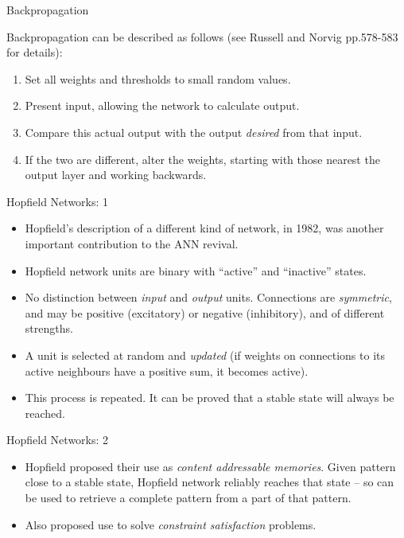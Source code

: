 \documentclass{article}
\begin{document}
\begin{slide}{}
{\Large Backpropagation}

Backpropagation can be described as follows (see Russell and Norvig
pp.578-583 for details):
\begin{enumerate}
\item Set all weights and thresholds to small random values.
\item Present input, allowing the network to calculate output.
\item Compare this actual output with the output {\em desired} from that input.
\item If the two are different, alter the weights, starting with those
nearest the output layer and working backwards.
\end{enumerate}
\end{slide}

\begin{slide}{}
{\Large Hopfield Networks: 1}
\begin{itemize}
\item Hopfield's  description of a different kind of network, in 1982,
was another important contribution to the ANN revival. 
\item Hopfield network units are binary with ``active'' and
``inactive'' states.
\item No distinction between {\em input} and {\em output}
units. Connections are {\em symmetric}, and may be
positive (excitatory) or negative (inhibitory), and of different
strengths.
\item A unit is selected at random and {\em updated} (if weights on
connections to its active neighbours have a positive sum, it becomes
active).
\item This process is repeated. It can be proved that a stable state
will always be reached.
\end{itemize}
\end{slide}

\begin{slide}{}
{\Large Hopfield Networks: 2}

\begin{center}


\end{center}
\begin{itemize}
\item Hopfield proposed their use as {\em content addressable
memories}. Given pattern close to
a stable state, Hopfield network reliably reaches that
state -- so can be used to retrieve a complete pattern from a part
of that pattern.
\item Also proposed use to solve {\em constraint satisfaction}
problems.
\end{itemize}
\end{slide}
\end{document}
